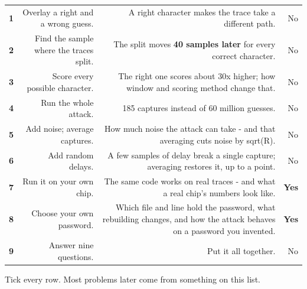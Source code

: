 \documentclass[11pt,letterpaper]{article}
\begin{document}
{\small{}
\begin{longtable}{|R{0.0725}|R{0.3043}|R{0.4783}|R{0.1449}|}
\hline
{} &  &  &  \\ \hline
\endhead
\textbf{1} & Overlay a right and a wrong guess. & A right character makes the trace take a different path. & No \\ \hline
\textbf{2} & Find the sample where the traces split. & The split moves \textbf{40 samples later} for every correct character. & No \\ \hline
\textbf{3} & Score every possible character. & The right one scores about 30x higher; how window and scoring method change that. & No \\ \hline
\textbf{4} & Run the whole attack. & 185 captures instead of 60 million guesses. & No \\ \hline
\textbf{5} & Add noise; average captures. & How much noise the attack can take - and that averaging cuts noise by sqrt(R). & No \\ \hline
\textbf{6} & Add random delays. & A few samples of delay break a single capture; averaging restores it, up to a point. & No \\ \hline
\textbf{7} & Run it on your own chip. & The same code works on real traces - and what a real chip's numbers look like. & \textbf{Yes} \\ \hline
\textbf{8} & Choose your own password. & Which file and line hold the password, what rebuilding changes, and how the attack behaves on a password you invented. & \textbf{Yes} \\ \hline
\textbf{9} & Answer nine questions. & Put it all together. & No \\ \hline
\end{longtable}}

\clearpage


Tick every row. Most problems later come from something on this list.
\end{document}
